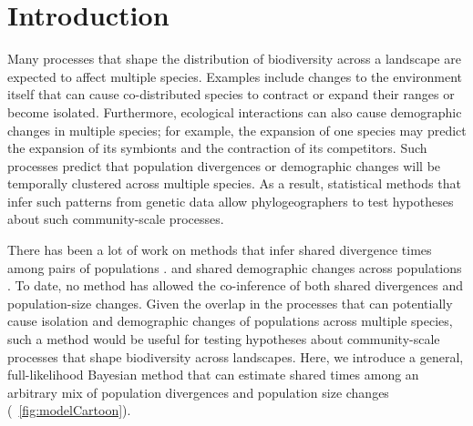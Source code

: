 \section{Introduction}

Many processes that shape the distribution of biodiversity across a landscape
are expected to affect multiple species.
Examples include changes to the environment itself that can cause
co-distributed species to contract or expand their ranges or become isolated.
Furthermore, ecological interactions can also cause demographic changes in
multiple species;
for example, the expansion of one species may predict the expansion of its
symbionts and the contraction of its competitors.
Such processes predict that population divergences or demographic changes will
be temporally clustered across multiple species.
As a result, statistical methods that infer such patterns from genetic data
allow phylogeographers to test hypotheses about such community-scale processes.

There has been a lot of work on methods that infer shared divergence times
among pairs of populations
\citep{Hickerson2006,Hickerson2007,Huang2011,Oaks2014dpp,Oaks2018ecoevolity}.
and shared demographic changes across populations
\citep{Chan2014,Xue2015,Burbrink2016,Xue2017,Gehara2017}.
To date, no method has allowed the co-inference of both shared divergences
and population-size changes.
Given the overlap in the processes that can potentially cause isolation and
demographic changes of populations across multiple species, such a method would
be useful for testing hypotheses about community-scale processes that shape
biodiversity across landscapes.
Here, we introduce a general, full-likelihood Bayesian method that can estimate
shared times among an arbitrary mix of population divergences and population
size changes (\fig{}~\ref{fig:modelCartoon}).

